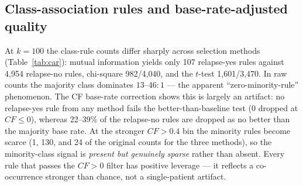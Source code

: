 \documentclass[twocolumn]{article}
\begin{document}
\begin{table}[h]
\centering
\small
\caption{Frequent-itemset mining runtime: Apriori vs.\ FP-Growth
(min support $0.10$, max itemset length 3). Itemset and rule output are
identical between the two algorithms.}
\label{tab:fpgrowth}
\end{table}

\subsection{Class-association rules and base-rate-adjusted quality}
\label{sec:res-car}

At $k=100$ the class-rule counts differ sharply across selection methods
(Table~\ref{tab:car}): mutual information yields only 107 relapse-yes rules
against 4{,}954 relapse-no rules, chi-square 982/4{,}040, and the $t$-test
1{,}601/3{,}470. In raw counts the majority class dominates
$13$--$46{:}1$ --- the apparent ``zero-minority-rule'' phenomenon. The CF
base-rate correction shows this is largely an artifact: no relapse-yes rule
from any method fails the better-than-baseline test (0 dropped at
$\mathit{CF} \le 0$), whereas 22--39\% of the relapse-no rules are dropped as
no better than the majority base rate. At the stronger $\mathit{CF} > 0.4$ bin
the minority rules become scarce (1, 130, and 24 of the original counts for
the three methods), so the minority-class signal is \emph{present but
genuinely sparse} rather than absent. Every rule that passes the
$\mathit{CF} > 0$ filter has positive leverage --- it reflects a co-occurrence
stronger than chance, not a single-patient artifact.
\end{document}
